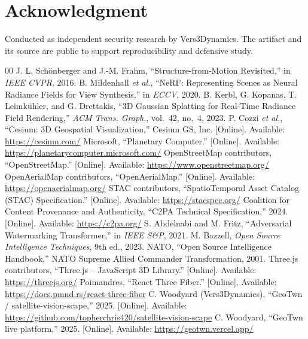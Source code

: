 \documentclass[conference]{IEEEtran}
\begin{document}
\section*{Acknowledgment}
Conducted as independent security research by Vers3Dynamics. The artifact and its
source are public to support reproducibility and defensive study.

\begin{thebibliography}{00}
 J. L. Sch\"onberger and J.-M. Frahm, ``Structure-from-Motion
Revisited,'' in \emph{IEEE CVPR}, 2016.
 B. Mildenhall \emph{et al.}, ``NeRF: Representing Scenes as Neural
Radiance Fields for View Synthesis,'' in \emph{ECCV}, 2020.
 B. Kerbl, G. Kopanas, T. Leimk\"uhler, and G. Drettakis, ``3D
Gaussian Splatting for Real-Time Radiance Field Rendering,'' \emph{ACM Trans.
Graph.}, vol.~42, no.~4, 2023.
 P. Cozzi \emph{et al.}, ``Cesium: 3D Geospatial Visualization,''
Cesium GS, Inc. [Online]. Available: \url{https://cesium.com/}
 Microsoft, ``Planetary Computer.'' [Online]. Available:
\url{https://planetarycomputer.microsoft.com/}
 OpenStreetMap contributors, ``OpenStreetMap.'' [Online]. Available:
\url{https://www.openstreetmap.org/}
 OpenAerialMap contributors, ``OpenAerialMap.'' [Online]. Available:
\url{https://openaerialmap.org/}
 STAC contributors, ``SpatioTemporal Asset Catalog (STAC)
Specification.'' [Online]. Available: \url{https://stacspec.org/}
 Coalition for Content Provenance and Authenticity, ``C2PA Technical
Specification,'' 2024. [Online]. Available: \url{https://c2pa.org/}
 S. Abdelnabi and M. Fritz, ``Adversarial Watermarking
Transformer,'' in \emph{IEEE S\&P}, 2021.
 M. Bazzell, \emph{Open Source Intelligence Techniques}, 9th ed.,
2023.
 NATO, ``Open Source Intelligence Handbook,'' NATO
Supreme Allied Commander Transformation, 2001.
 Three.js contributors, ``Three.js -- JavaScript 3D Library.''
[Online]. Available: \url{https://threejs.org/}
 Poimandres, ``React Three Fiber.'' [Online]. Available:
\url{https://docs.pmnd.rs/react-three-fiber}
 C. Woodyard (Vers3Dynamics), ``GeoTwn / satellite-vision-scape,''
2025. [Online]. Available:
\url{https://github.com/topherchris420/satellite-vision-scape}
 C. Woodyard, ``GeoTwn live platform,'' 2025. [Online]. Available:
\url{https://geotwn.vercel.app/}
\end{thebibliography}
\end{document}
